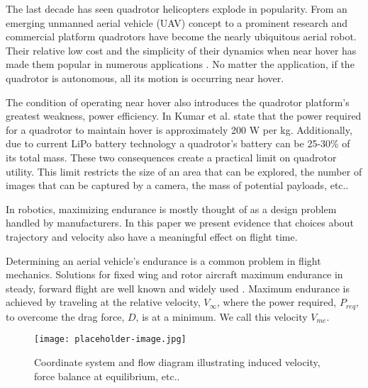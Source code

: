  
The last decade has seen quadrotor helicopters explode in popularity. From an emerging unmanned aerial vehicle (UAV) concept to a prominent research and commercial platform \cite{kumar2012opportunities,hoffmann2007quadrotor} quadrotors have become the nearly ubiquitous aerial robot. Their relative low cost and the simplicity of their dynamics when near hover \cite{bouabdallah2004pid} has made them popular in numerous applications \cite{heng2015efficient,roberts2017submodular,frazzoli2002real}. No matter the application, if the quadrotor is autonomous, all its motion is occurring near hover.

The condition of operating near hover also introduces the quadrotor platform's greatest weakness, power efficiency. In \cite{kumar2012opportunities} Kumar et al. state that the power required for a quadrotor to maintain hover is approximately 200 W per kg. Additionally, due to current LiPo battery technology a quadrotor's battery can be 25-30\% of its total mass. These two consequences create a practical limit on quadrotor utility. This limit restricts the size of an area that can be explored, the number of images that can be captured by a camera, the mass of potential payloads, etc..

In robotics, maximizing endurance is mostly thought of as a design problem handled by manufacturers. In this paper we present evidence that choices about trajectory and velocity also have a meaningful effect on flight time.

Determining an aerial vehicle's endurance is a common problem in flight mechanics. Solutions for fixed wing and rotor aircraft maximum endurance in steady, forward flight are well known and widely used \cite{anderson2005introduction,leishman2006principles}. Maximum endurance is achieved by traveling at the relative velocity, $V_\infty$, where the power required, $P_{req}$, to overcome the drag force, $D$, is at a minimum. We call this velocity $V_{me}$. 


\begin{figure}[ht]
    \label{QuadDiagram}
	\centering
	\texttt{[image: placeholder-image.jpg]}
	\caption{Coordinate system and flow diagram illustrating induced velocity, force balance at equilibrium, etc..}
\end{figure}
